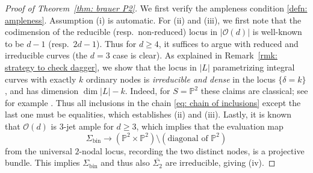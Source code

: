 \documentclass[11pt]{amsart}
\theoremstyle{plain}
\theoremstyle{definition}
\theoremstyle{remark}
\begin{document}
\begin{proof}[Proof of Theorem~\ref{thm: brauer P2}] We first verify the ampleness condition \ref{defn: ampleness}. Assumption (i) is automatic. For (ii) and (iii), we first note that the codimension of the reducible (resp.~non-reduced) locus in $|\mathcal{O}(d)|$ is well-known to be $d-1$ (resp.~$2d-1$). Thus for $d\geq 4$, it suffices to argue with reduced and irreducible curves (the $d=3$ case is clear). As explained in Remark~\ref{rmk: strategy to check dagger}, we show that the locus in $|L|$ parametrizing integral curves with exactly $k$ ordinary nodes is \textit{irreducible and dense} in the locus $\{\delta = k\}$,
and has dimension $\dim |L| - k$. Indeed, for $S= \mathbb P^2$ these claims are classical; see for example \cite{AC, Z1, Harris}. Thus all inclusions in the chain \eqref{eq: chain of inclusions} except the last one must be equalities, which establishes (ii) and (iii). Lastly, it is known that $\mathcal{O}(d)$ is $3$-jet ample for $d\geq 3$, which implies that the evaluation map
    \[
    \Sigma_\mathrm{bin} \to (\mathbb P^2 \times \mathbb P^2) \setminus (\textrm{diagonal of } \mathbb {P}^2)
    \]
    from the universal $2$-nodal locus, recording the two distinct nodes, is a projective bundle. This implies $\Sigma_\mathrm{bin}$ and thus also $\overline{\Sigma_2}$ are irreducible, giving (iv).



\end{proof}
\end{document}
